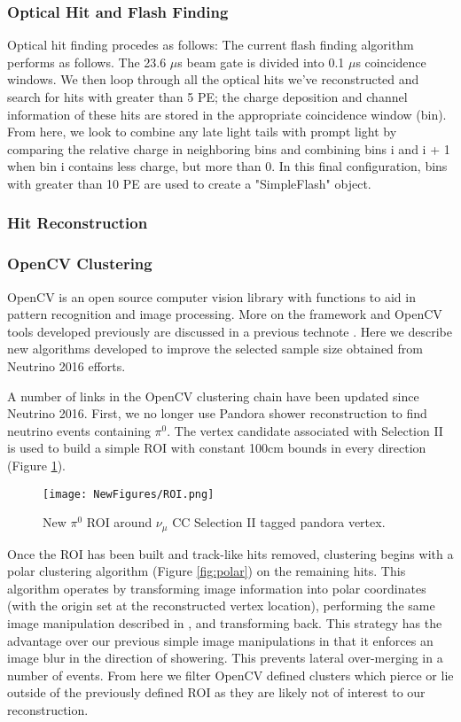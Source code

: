 \documentclass[12pt]{article}
\begin{document}
\subsubsection{Optical Hit and Flash Finding }
Optical hit finding procedes as follows:
The current flash finding algorithm performs as follows.  The 23.6 $\mu$s beam gate is divided into 0.1 $\mu$s coincidence windows. We then loop through all the optical hits we've reconstructed and search for hits with greater than 5 PE; the charge deposition and channel information of these hits are stored in the appropriate coincidence window (bin).  From here, we look to combine any late light tails with prompt light by comparing the relative charge in neighboring bins and combining bins i and i + 1 when bin i contains less charge, but more than 0.  In this final configuration, bins with greater than 10 PE are used to create a "SimpleFlash" object.
\subsubsection{Hit Reconstruction}
\subsubsection{OpenCV Clustering}
OpenCV is an open source computer vision library with functions to aid in pattern recognition and image processing. More on the framework and OpenCV tools developed previously are discussed in a previous technote \cite{bib:5856}. Here we describe new algorithms developed to improve the selected sample size obtained from Neutrino 2016 efforts\cite{bib:5864}.
\par A number of links in the OpenCV clustering chain have been updated since Neutrino 2016. First, we no longer use Pandora shower reconstruction to find neutrino events containing $\pi^0$. The vertex candidate associated with Selection II is used to build a simple ROI with constant 100cm bounds in every direction (Figure \ref{fig:roi}). 

\begin{figure}[h!]
\centering
\texttt{[image: NewFigures/ROI.png]}
\caption{New $\pi^0$ ROI around $\nu_\mu$ CC Selection II tagged pandora vertex. }
\label{fig:roi}
\end{figure}

\par Once the ROI has been built and track-like hits removed, clustering begins with a polar clustering algorithm (Figure \ref{fig:polar}) on the remaining hits. This algorithm operates by transforming image information into polar coordinates (with the origin set at the reconstructed vertex location), performing the same image manipulation described in \cite{bib:5856}, and transforming back. This strategy has the advantage over our previous simple image manipulations in that it enforces an image blur in the direction of showering. This prevents lateral over-merging in a number of events. From here we filter OpenCV defined clusters which pierce or lie outside of the previously defined ROI as they are likely not of interest to our reconstruction. 
\end{document}
